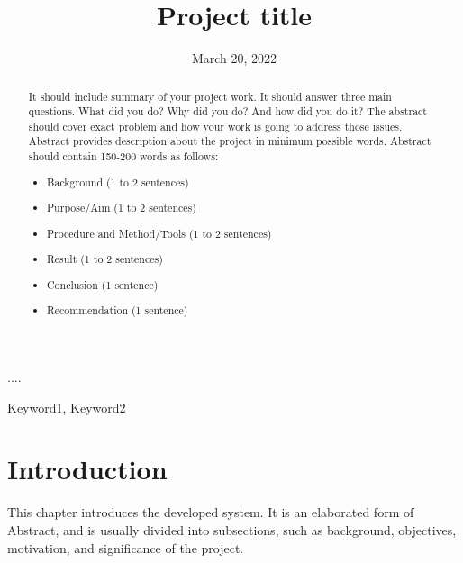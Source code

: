 \documentclass{projectreport}
\title{Project title}
\date{March 20, 2022}
\begin{document}
	\maketitle
	
	\makebonafidecertificate
	
	\begin{acknowledgements}
		....		
	\end{acknowledgements}
	
	
	
	
	\begin{abstract}
		It should include summary of your project work. It should answer three main questions. What did you do? Why did you do? And how did you do it? The abstract should cover exact problem and how your work is going to address those issues. Abstract provides description about the project in minimum possible words. Abstract should contain 150-200 words as follows:
		
		\begin{itemize}
			\item Background (1 to 2 sentences)
			\item Purpose/Aim (1 to 2 sentences)
			\item Procedure and Method/Tools (1 to 2 sentences)
			\item Result (1 to 2 sentences)
			\item Conclusion (1 sentence)
			\item Recommendation (1 sentence)
		\end{itemize}
		
	\end{abstract}

	\begin{keywords}
		Keyword1, Keyword2
	\end{keywords}

	\setcounter{page}{1}
		
	\tableofcontents
	\listoffigures
	\listoftables
	
	\clearpage
	\printnoidxglossary[ title=Abbreviations]
	
	
	\chapter{Introduction}
	\setcounter{page}{1}
	This chapter introduces the developed system. It is an elaborated form of Abstract, and is usually divided into subsections, such as background, objectives, motivation, and significance of the project.
	
\end{document}

